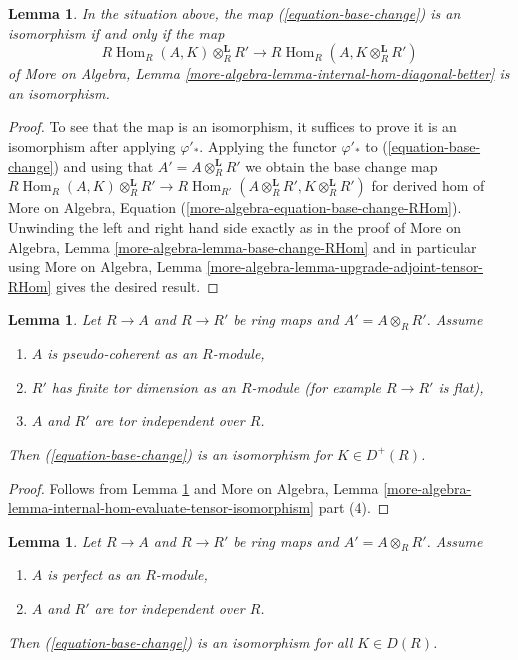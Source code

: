 \documentclass{stacks-project}
\theoremstyle{plain}
\newtheorem{lemma}[subsection]{Lemma}
\theoremstyle{definition}
\theoremstyle{remark}
\numberwithin{equation}{subsection}
\def\Hom{\mathop{\mathrm{Hom}}\nolimits}
\begin{document}
\begin{lemma}
\label{lemma-check-base-change-is-iso}
In the situation above, the map (\ref{equation-base-change})
is an isomorphism if and only if the map
$$
R\Hom_R(A, K) \otimes_R^\mathbf{L} R'
\longrightarrow
R\Hom_R(A, K \otimes_R^\mathbf{L} R')
$$
of More on Algebra, Lemma
\ref{more-algebra-lemma-internal-hom-diagonal-better} is an isomorphism.
\end{lemma}

\begin{proof}
To see that the map is an isomorphism, it suffices to prove it
is an isomorphism after applying $\varphi'_*$.
Applying the functor $\varphi'_*$ to (\ref{equation-base-change})
and using that $A' = A \otimes_R^\mathbf{L} R'$
we obtain the base change map
$R\Hom_R(A, K) \otimes_R^\mathbf{L} R' \to
R\Hom_{R'}(A \otimes_R^\mathbf{L} R', K \otimes_R^\mathbf{L} R')$
for derived hom of
More on Algebra, Equation (\ref{more-algebra-equation-base-change-RHom}).
Unwinding the left and right hand side exactly as in the proof of
More on Algebra, Lemma \ref{more-algebra-lemma-base-change-RHom}
and in particular using
More on Algebra, Lemma \ref{more-algebra-lemma-upgrade-adjoint-tensor-RHom}
gives the desired result.
\end{proof}

\begin{lemma}
\label{lemma-flat-bc-surjection}
Let $R \to A$ and $R \to R'$ be ring maps and $A' = A \otimes_R R'$.
Assume
\begin{enumerate}
\item $A$ is pseudo-coherent as an $R$-module,
\item $R'$ has finite tor dimension as an $R$-module (for example
$R \to R'$ is flat),
\item $A$ and $R'$ are tor independent over $R$.
\end{enumerate}
Then (\ref{equation-base-change}) is an isomorphism for $K \in D^+(R)$.
\end{lemma}

\begin{proof}
Follows from Lemma \ref{lemma-check-base-change-is-iso} and
More on Algebra, Lemma
\ref{more-algebra-lemma-internal-hom-evaluate-tensor-isomorphism} part (4).
\end{proof}

\begin{lemma}
\label{lemma-bc-surjection}
Let $R \to A$ and $R \to R'$ be ring maps and $A' = A \otimes_R R'$.
Assume
\begin{enumerate}
\item $A$ is perfect as an $R$-module,
\item $A$ and $R'$ are tor independent over $R$.
\end{enumerate}
Then (\ref{equation-base-change}) is an isomorphism for all $K \in D(R)$.
\end{lemma}
\end{document}
